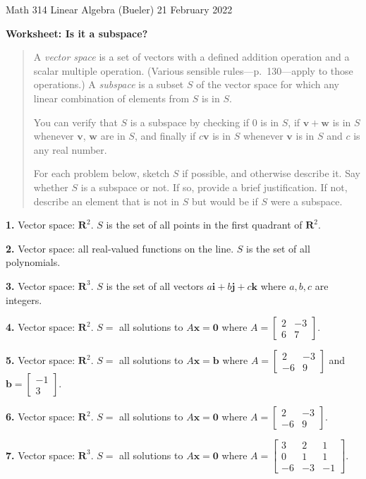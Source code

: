 \documentclass[12pt]{amsart}
\newcommand{\bb}{\mathbf{b}}
\newcommand{\bi}{\mathbf{i}}
\newcommand{\bj}{\mathbf{j}}
\newcommand{\bk}{\mathbf{k}}
\newcommand{\bv}{\mathbf{v}}
\newcommand{\bw}{\mathbf{w}}
\newcommand{\bx}{\mathbf{x}}
\newcommand{\bzero}{\bm{0}}
\newcommand{\RR}{\mathbf{R}}
\newcommand{\prob}[1]{\bigskip\noindent\textbf{#1.}\quad }
\begin{document}
\scriptsize \noindent Math 314 Linear Algebra (Bueler) \hfill 21 February 2022 
\normalsize\medskip

\Large\centerline{\textbf{Worksheet: Is it a subspace?}}
\medskip
\normalsize

\thispagestyle{empty}
\begin{quote}
A \emph{vector space} is a set of vectors with a defined addition operation and a scalar multiple operation.  (Various sensible rules---p.~130---apply to those operations.)  A \emph{subspace} is a subset $S$ of the vector space for which any linear combination of elements from $S$ is in $S$.

You can verify that $S$ is a subspace by checking if $0$ is in $S$, if $\bv+\bw$ is in $S$ whenever $\bv$, $\bw$ are in $S$, and finally if $c\bv$ is in $S$ whenever $\bv$ is in $S$ and $c$ is any real number.

For each problem below, sketch $S$ if possible, and otherwise describe it.  Say whether $S$ is a subspace or not.  If so, provide a brief justification.  If not, describe an element that is not in $S$ but would be if $S$ were a subspace.
\end{quote}

\prob{1}  Vector space: $\RR^2$.  $S$ is the set of all points in the first quadrant of $\RR^2$.
\vfill

\prob{2}  Vector space: all real-valued functions on the line.  $S$ is the set of all polynomials.
\vfill

\prob{3}  Vector space: $\RR^3$.  $S$ is the set of all vectors $a\bi + b \bj + c\bk$ where $a,b,c$ are integers.
\vfill

\clearpage \newpage
\prob{4}  Vector space: $\RR^2$.  $S=$ all solutions to $A \bx = \bzero$ where $A=\begin{bmatrix} 2 & -3 \\ 6 & 7 \end{bmatrix}$.
\vfill

\prob{5}  Vector space: $\RR^2$.  $S=$ all solutions to $A \bx = \bb$ where $A=\begin{bmatrix} 2 & -3 \\ -6 & 9 \end{bmatrix}$ and $\bb = \begin{bmatrix}
-1 \\ 3 \end{bmatrix}$.
\vfill

\prob{6}  Vector space: $\RR^2$.  $S=$ all solutions to $A \bx = \bzero$ where $A=\begin{bmatrix} 2 & -3 \\ -6 & 9 \end{bmatrix}$.
\vfill

\prob{7}  Vector space: $\RR^3$.  $S=$ all solutions to $A \bx = \bzero$ where $A=\begin{bmatrix} 3 & 2 & 1 \\ 0 & 1 & 1 \\ -6 & -3 & -1 \end{bmatrix}$.
\vfill
\end{document}
